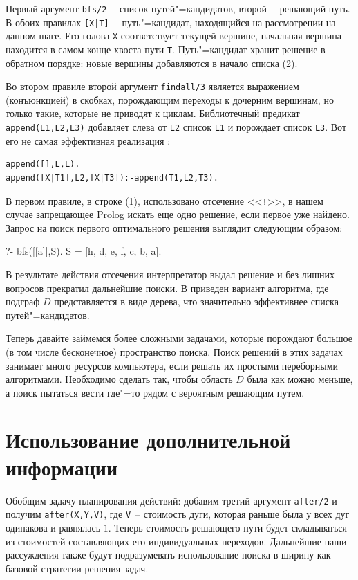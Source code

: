 \documentclass[a4paper,14pt, openany, twoside, final]{extbook} %
\begin{document}
Первый аргумент \texttt{bfs/2}~-- список путей"=кандидатов, второй~-- решающий путь.  В обоих правилах \texttt{[X|T]}~-- путь"=кандидат, находящийся на рассмотрении на данном шаге. Его голова \texttt{X} соответствует текущей вершине, начальная вершина находится в самом конце хвоста пути \texttt{T}.  Путь"=кандидат хранит решение в обратном порядке: новые вершины добавляются в начало списка (2).

Во втором правиле второй аргумент \texttt{findall/3} является выражением (конъюнкцией) в скобках, порождающим переходы к дочерним вершинам, но только такие, которые не приводят к циклам.  Библиотечный предикат \texttt{append(L1,L2,L3)} добавляет слева от \texttt{L2} список \texttt{L1} и порождает список \texttt{L3}.  Вот его не самая эффективная реализация \cite{Bratko}:

\begin{verbatim}
append([],L,L).
append([X|T1],L2,[X|T3]):-append(T1,L2,T3).
\end{verbatim}


В первом правиле, в строке (1), использовано отсечение <<\texttt{!}>>, в нашем случае запрещающее Prolog искать еще одно решение, если первое уже найдено.  Запрос на поиск первого оптимального решения выглядит следующим образом:

\begin{proexp}
?- bfs([[a]],S).
S = [h, d, e, f, c, b, a].
\end{proexp}

\noindent В результате действия отсечения интерпретатор выдал решение и без лишних вопросов прекратил дальнейшие поиски.  В \cite{Bratko} приведен вариант алгоритма, где подграф $D$ представляется в виде дерева, что значительно эффективнее списка путей"=кандидатов.

Теперь давайте займемся более сложными задачами, которые порождают большое (в том числе бесконечное) пространство поиска.  Поиск решений в этих задачах занимает много ресурсов компьютера, если решать их простыми переборными алгоритмами.  Необходимо сделать так, чтобы область $D$ была как можно меньше, а поиск пытаться вести где"=то рядом с вероятным решающим путем.

\section{Использование дополнительной информации}
\label{sec:informedsearch}

Обобщим задачу планирования действий: добавим третий аргумент \texttt{after/2} и получим \texttt{after(X,Y,V)}, где \texttt{V}~-- стоимость дуги, которая раньше была у всех дуг одинакова и равнялась $1$.   Теперь стоимость решающего пути будет складываться из стоимостей составляющих его индивидуальных переходов.  Дальнейшие наши рассуждения также будут подразумевать использование поиска в ширину как базовой стратегии решения задач.
\end{document}
